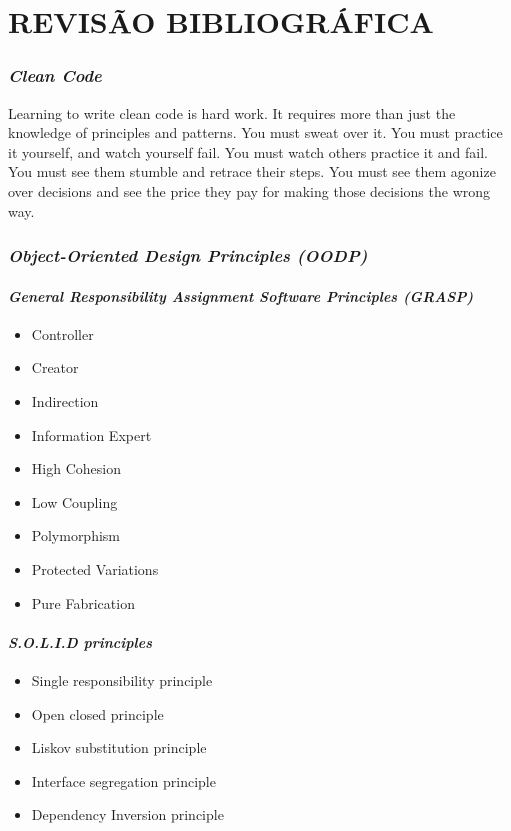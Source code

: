 \documentclass[12pt]{article}
\begin{document}
\part{REVISÃO BIBLIOGRÁFICA} \label{sec:revisaobibliografica}

\section{\textit{Clean Code}} \label{sec:cleancode}

Learning to write clean code is hard work. It requires more than just the knowledge of
principles and patterns. You must sweat over it. You must practice it yourself, and watch
yourself fail. You must watch others practice it and fail. You must see them stumble and
retrace their steps. You must see them agonize over decisions and see the price they pay for
making those decisions the wrong way.

\section{\textit{Object-Oriented Design Principles (OODP)}} \label{sec:oopd}

\subsection{\textit{General Responsibility Assignment Software Principles (GRASP)}} \label{sec:grasp}

\begin{itemize}
	\item Controller
	\item Creator
	\item Indirection
	\item Information Expert
	\item High Cohesion
	\item Low Coupling
	\item Polymorphism
	\item Protected Variations
	\item Pure Fabrication
\end{itemize}

\subsection{\textit{S.O.L.I.D principles}} \label{sec:solid}
\begin{itemize}
	\item Single responsibility principle
	\item Open closed principle
	\item Liskov substitution principle
	\item Interface segregation principle
	\item Dependency Inversion principle
\end{itemize}
\end{document}
